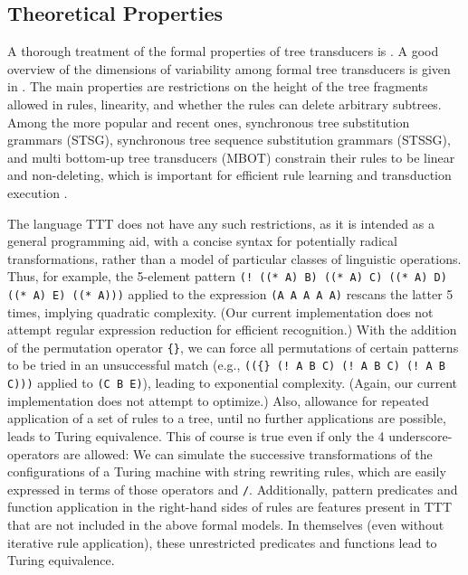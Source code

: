 \documentclass[a4,11pt]{article}
\begin{document}
\subsection*{Theoretical Properties} 

A thorough treatment of the formal properties of tree transducers is \cite{Comon:2007}. A good overview of the dimensions of variability among formal tree transducers is given in \cite{Knight:2007}. The main properties are restrictions on the height of the tree fragments allowed in rules, linearity, and whether the rules can delete arbitrary subtrees.  Among the more popular and recent ones, synchronous tree substitution grammars (STSG), synchronous tree sequence substitution grammars (STSSG), and multi bottom-up tree transducers (MBOT)  constrain their rules to be linear and non-deleting, which is important for efficient rule learning and transduction execution \cite{Chiang:2004,Galley:2004,Yamada-Knight:2001,Zhang:2008,Maletti:2010}.  

The language TTT does not have any such restrictions, as it is intended as a general programming aid, with a concise syntax for potentially radical transformations, rather than a model of particular classes of linguistic operations. Thus, for example, the 5-element pattern \texttt{(!~((* A) B) ((* A) C) ((* A) D) ((* A) E) ((* A)))} applied to the expression \texttt{(A A A A A)} rescans the latter 5 times, implying quadratic complexity. (Our current implementation does not attempt regular expression reduction for efficient recognition.) With the addition of the permutation operator \texttt{\{\}}, we can force all permutations of certain patterns to be tried in an unsuccessful match (e.g., \texttt{((\{\} (!~A B C) (!~A B C) (!~A B C)))} applied to \texttt{(C B E)}), leading to exponential complexity. (Again, our current implementation does not attempt to optimize.) Also, allowance for repeated application of a set of rules to a tree, until no further applications are possible, leads to Turing equivalence. This of course is true even if only the 4 underscore-operators are allowed: We can simulate the successive transformations of the configurations of a Turing machine with string rewriting rules, which are easily expressed in terms of those operators and \texttt{/}.
Additionally, pattern predicates and function application in the right-hand sides of rules are features present in TTT that are not included in the above formal models. In themselves (even without iterative rule application), these unrestricted predicates and functions lead to Turing equivalence.
\end{document}
